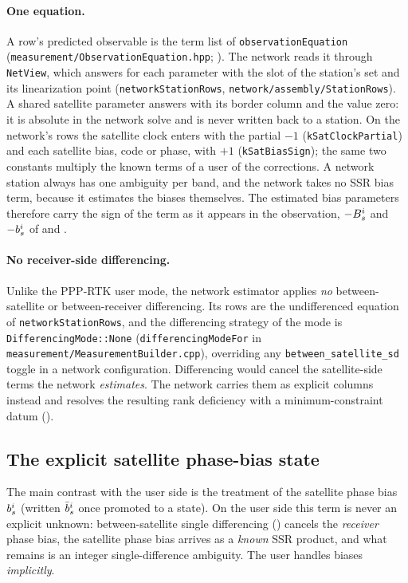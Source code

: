 \documentclass[main.tex]{subfiles}
\begin{document}
\paragraph{One equation.}
A row's predicted observable is the term list of
\texttt{observationEquation} (\texttt{measurement/ObservationEquation.hpp};
). The network reads it
through \texttt{NetView}, which answers for each parameter with the slot
of the station's set and its linearization point
(\texttt{networkStationRows}, \texttt{network/assembly/StationRows}). A
shared satellite parameter answers with its border column and the value
zero: it is absolute in the network solve and is never written back to a
station. On the network's rows the satellite clock enters with the partial
$-1$ (\texttt{kSatClockPartial}) and each satellite bias, code or phase,
with $+1$ (\texttt{kSatBiasSign}); the same two constants multiply the
known terms of a user of the corrections. A network station always has
one ambiguity per band, and the network takes no SSR bias term, because
it estimates the biases themselves. The estimated bias parameters
therefore carry the sign of the term as it appears in the observation,
$-B^i_s$ and $-b^i_s$ of
 and
.

\paragraph{No receiver-side differencing.}
Unlike the PPP-RTK user mode, the network estimator applies \emph{no}
between-satellite or between-receiver differencing. Its rows are the
undifferenced equation of \texttt{networkStationRows}, and the
differencing strategy of the mode is \texttt{DifferencingMode::None}
(\texttt{differencingModeFor} in \texttt{measurement/MeasurementBuilder.cpp}),
overriding any \texttt{between\_satellite\_sd} toggle in a network
configuration. Differencing would cancel the satellite-side terms the
network \emph{estimates}. The network carries them as explicit columns
instead and resolves the resulting rank deficiency with a
minimum-constraint datum ().

\subsection{The explicit satellite phase-bias state}\label{sec:net-phasebias}

The main contrast with the user side is the treatment of the
satellite phase bias $b^i_s$ (written $\bar b^i_s$
once promoted to a state). On the user side this term is never an
explicit unknown: between-satellite single differencing
() cancels the
\emph{receiver} phase bias, the satellite phase bias arrives as a
\emph{known} SSR product, and what remains is an integer
single-difference ambiguity. The user handles biases \emph{implicitly}.
\end{document}
